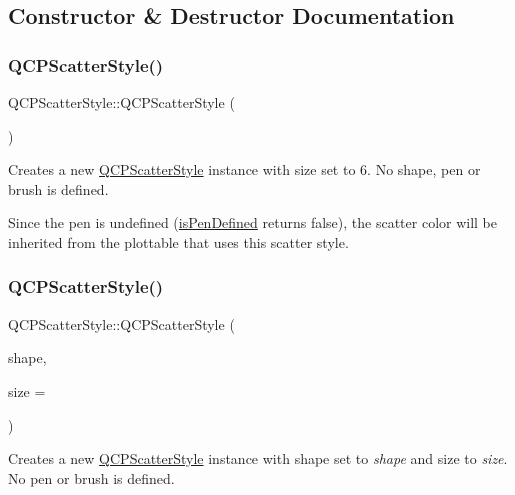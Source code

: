 \subsection{Constructor \& Destructor Documentation}
\mbox{\label{class_q_c_p_scatter_style_a8836018d9ad83ccd8870de8315c1be73}} 
\subsubsection{\texorpdfstring{QCPScatterStyle()}{QCPScatterStyle()}\hspace{0.1cm}{\footnotesize\ttfamily [1/7]}}
{\footnotesize\ttfamily Q\+C\+P\+Scatter\+Style\+::\+Q\+C\+P\+Scatter\+Style (\begin{DoxyParamCaption}{ }\end{DoxyParamCaption})}

Creates a new \mbox{\hyperlink{class_q_c_p_scatter_style}{Q\+C\+P\+Scatter\+Style}} instance with size set to 6. No shape, pen or brush is defined.

Since the pen is undefined (\mbox{\hyperlink{class_q_c_p_scatter_style_a47077eb6450fe9a788f833e4ec1b1d5a}{is\+Pen\+Defined}} returns false), the scatter color will be inherited from the plottable that uses this scatter style. \mbox{\label{class_q_c_p_scatter_style_a003d92f74f4561eda111862eadd62f28}} 
\subsubsection{\texorpdfstring{QCPScatterStyle()}{QCPScatterStyle()}\hspace{0.1cm}{\footnotesize\ttfamily [2/7]}}
{\footnotesize\ttfamily Q\+C\+P\+Scatter\+Style\+::\+Q\+C\+P\+Scatter\+Style (\begin{DoxyParamCaption}\item[{\mbox{\hyperlink{class_q_c_p_scatter_style_adb31525af6b680e6f1b7472e43859349}{Scatter\+Shape}}}]{shape,  }\item[{double}]{size = {} }\end{DoxyParamCaption})}

Creates a new \mbox{\hyperlink{class_q_c_p_scatter_style}{Q\+C\+P\+Scatter\+Style}} instance with shape set to {\itshape shape} and size to {\itshape size}. No pen or brush is defined.

